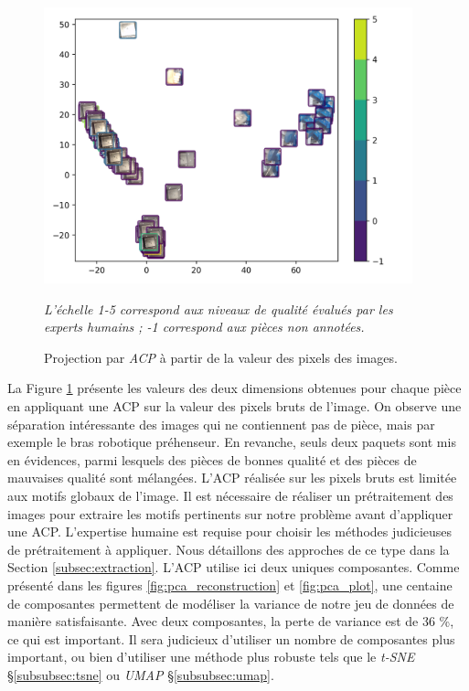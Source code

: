 \begin{figure}[hbtp]
	\centering
	\includegraphics[width=0.95\textwidth,height=\textheight,keepaspectratio]{../Chap4/Figures/visualize_PCA_pixel_space.png}
	\caption{Projection par \textit{ACP} à partir de la valeur des pixels des images.}
	\textit{L'échelle 1-5 correspond aux niveaux de qualité évalués par les experts humains ; -1 correspond aux pièces non annotées.}
	\label{fig:ACP}
\end{figure}

La Figure \ref{fig:ACP} présente les valeurs des deux dimensions obtenues pour chaque pièce en appliquant une ACP sur la valeur des pixels bruts de l'image.
On observe une séparation intéressante des images qui ne contiennent pas de pièce, mais par exemple le bras robotique préhenseur.
En revanche, seuls deux paquets sont mis en évidences, parmi lesquels des pièces de bonnes qualité et des pièces de mauvaises qualité sont mélangées.
L'ACP réalisée sur les pixels bruts est limitée aux motifs globaux de l'image.
Il est nécessaire de réaliser un prétraitement des images pour extraire les motifs pertinents sur notre problème avant d'appliquer une ACP.
L'expertise humaine est requise pour choisir les méthodes judicieuses de prétraitement à appliquer.
Nous détaillons des approches de ce type dans la Section \ref{subsec:extraction}.
L'ACP utilise ici deux uniques composantes.
Comme présenté dans les figures \ref{fig:pca_reconstruction} et \ref{fig:pca_plot}, une centaine de composantes permettent de modéliser la variance de notre jeu de données de manière satisfaisante.
Avec deux composantes, la perte de variance est de 36 \%, ce qui est important.
Il sera judicieux d'utiliser un nombre de composantes plus important, ou bien d'utiliser une méthode plus robuste tels que le \textit{t-SNE} §\ref{subsubsec:tsne} ou \textit{UMAP} §\ref{subsubsec:umap}.

